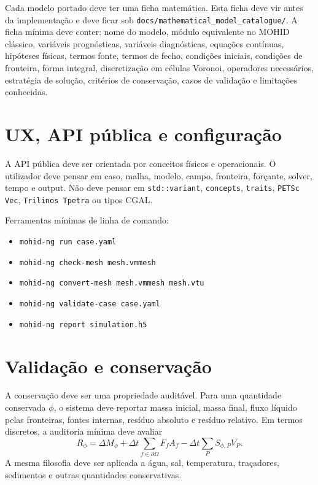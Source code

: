 \documentclass[11pt,a4paper]{article}
\begin{document}
Cada modelo portado deve ter uma ficha matemática. Esta ficha deve vir antes da implementação e deve ficar sob \texttt{docs/mathematical\_model\_catalogue/}. A ficha mínima deve conter: nome do modelo, módulo equivalente no MOHID clássico, variáveis prognósticas, variáveis diagnósticas, equações contínuas, hipóteses físicas, termos fonte, termos de fecho, condições iniciais, condições de fronteira, forma integral, discretização em células Voronoi, operadores necessários, estratégia de solução, critérios de conservação, casos de validação e limitações conhecidas.

\section{UX, API pública e configuração}

A API pública deve ser orientada por conceitos físicos e operacionais. O utilizador deve pensar em caso, malha, modelo, campo, fronteira, forçante, solver, tempo e output. Não deve pensar em \texttt{std::variant}, \texttt{concepts}, \texttt{traits}, \texttt{PETSc Vec}, \texttt{Trilinos Tpetra} ou tipos CGAL.

Ferramentas mínimas de linha de comando:
\begin{itemize}
\item \texttt{mohid-ng run case.yaml}
\item \texttt{mohid-ng check-mesh mesh.vmmesh}
\item \texttt{mohid-ng convert-mesh mesh.vmmesh mesh.vtu}
\item \texttt{mohid-ng validate-case case.yaml}
\item \texttt{mohid-ng report simulation.h5}
\end{itemize}

\section{Validação e conservação}

A conservação deve ser uma propriedade auditável. Para uma quantidade conservada \(\phi\), o sistema deve reportar massa inicial, massa final, fluxo líquido pelas fronteiras, fontes internas, resíduo absoluto e resíduo relativo. Em termos discretos, a auditoria mínima deve avaliar
\[
R_\phi = \Delta M_\phi + \Delta t\sum_{f\in\partial\Omega} F_f A_f - \Delta t\sum_P S_{\phi,P}V_P.
\]
A mesma filosofia deve ser aplicada a água, sal, temperatura, traçadores, sedimentos e outras quantidades conservativas.
\end{document}
